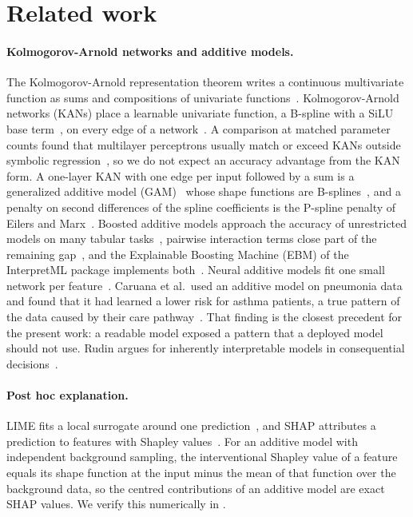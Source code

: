 \section{Related work}
\label{sec:related}

\paragraph{Kolmogorov-Arnold networks and additive models.}
The Kolmogorov-Arnold representation theorem writes a continuous multivariate function as sums and compositions of univariate functions~\cite{kolmogorov1963representation}. Kolmogorov-Arnold networks (KANs) place a learnable univariate function, a B-spline with a SiLU base term~\cite{elfwing2018silu}, on every edge of a network~\cite{liu2025kan}. A comparison at matched parameter counts found that multilayer perceptrons usually match or exceed KANs outside symbolic regression~\cite{yu2024kanormlp}, so we do not expect an accuracy advantage from the KAN form. A one-layer KAN with one edge per input followed by a sum is a generalized additive model (GAM)~\cite{hastie1986gam} whose shape functions are B-splines~\cite{deboor1978splines}, and a penalty on second differences of the spline coefficients is the P-spline penalty of Eilers and Marx~\cite{eilers1996psplines}. Boosted additive models approach the accuracy of unrestricted models on many tabular tasks~\cite{lou2012intelligible}, pairwise interaction terms close part of the remaining gap~\cite{lou2013ga2m}, and the Explainable Boosting Machine (EBM) of the InterpretML package implements both~\cite{nori2019interpretml}. Neural additive models fit one small network per feature~\cite{agarwal2021nam}. Caruana et al.\ used an additive model on pneumonia data and found that it had learned a lower risk for asthma patients, a true pattern of the data caused by their care pathway~\cite{caruana2015intelligible}. That finding is the closest precedent for the present work: a readable model exposed a pattern that a deployed model should not use. Rudin argues for inherently interpretable models in consequential decisions~\cite{rudin2019stop}.

\paragraph{Post hoc explanation.}
LIME fits a local surrogate around one prediction~\cite{ribeiro2016lime}, and SHAP attributes a prediction to features with Shapley values~\cite{lundberg2017shap}. For an additive model with independent background sampling, the interventional Shapley value of a feature equals its shape function at the input minus the mean of that function over the background data, so the centred contributions of an additive model are exact SHAP values. We verify this numerically in .

